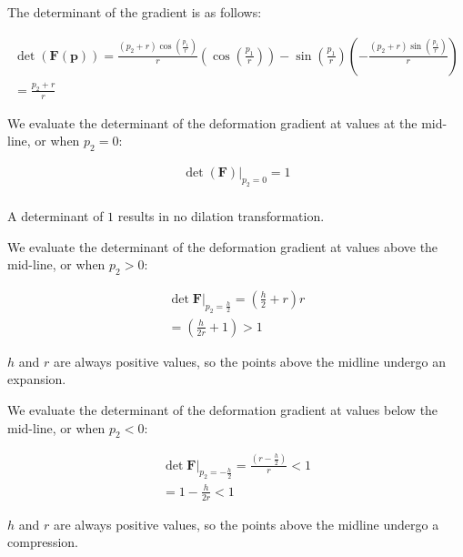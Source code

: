\begin{problem}
    \noindent
    \normalfont
    The determinant of the gradient is as follows:

\begin{align}
\det(\mathbf{F}(\mathbf{p}))=\frac{(p_{2}+r)\cos\left( \frac{p_{1}}{r} \right)}{r}\left( \cos\left( \frac{p_{1}}{r} \right) \right)-\sin\left( \frac{p_{1}}{r} \right)\left( -\frac{(p_{2}+r)\sin\left( \frac{p_{1}}{r} \right)}{r} \right) \\
=\frac{p_{2}+r}{r}
\end{align}

We evaluate the determinant of the deformation gradient at values at the mid-line, or when $p_{2}=0$:

\begin{align}
\det(\mathbf{F})|_{p_{2}=0}=1 \\
\end{align}

A determinant of $1$ results in no dilation transformation.



We evaluate the determinant of the deformation gradient at values above the mid-line, or when $p_{2}>0$:

\begin{align}
\det \mathbf{F}|_{p_{2}=\frac{h}{2}}={\left( \frac{h}{2}+r \right)}{r} \\
=\left( \frac{h}{2r}+1 \right)>1
\end{align}


$h$ and $r$ are always positive values, so the points above the midline undergo an expansion.

We evaluate the determinant of the deformation gradient at values below the mid-line, or when $p_{2}<0$:

\begin{align}
\det \mathbf{F}|_{p_{2}=-\frac{h}{2}}=\frac{\left( r-\frac{h}{2} \right)}{r}<1 \\
=1-\frac{h}{2r}<1
\end{align}

$h$ and $r$ are always positive values, so the points above the midline undergo a compression.
\end{problem}
